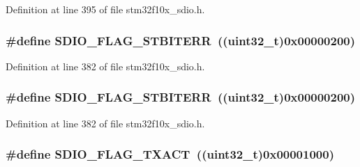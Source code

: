 Definition at line 395 of file stm32f10x\+\_\+sdio.\+h.

\subsubsection[{\texorpdfstring{S\+D\+I\+O\+\_\+\+F\+L\+A\+G\+\_\+\+S\+T\+B\+I\+T\+E\+RR}{SDIO_FLAG_STBITERR}}]{\setlength{\rightskip}{0pt plus 5cm}\#define S\+D\+I\+O\+\_\+\+F\+L\+A\+G\+\_\+\+S\+T\+B\+I\+T\+E\+RR~(({\bf uint32\+\_\+t})0x00000200)}\hypertarget{group___s_d_i_o___flags_gae83f7cb3fa1183898131f3de47c2333e}{}\label{group___s_d_i_o___flags_gae83f7cb3fa1183898131f3de47c2333e}


Definition at line 382 of file stm32f10x\+\_\+sdio.\+h.

\subsubsection[{\texorpdfstring{S\+D\+I\+O\+\_\+\+F\+L\+A\+G\+\_\+\+S\+T\+B\+I\+T\+E\+RR}{SDIO_FLAG_STBITERR}}]{\setlength{\rightskip}{0pt plus 5cm}\#define S\+D\+I\+O\+\_\+\+F\+L\+A\+G\+\_\+\+S\+T\+B\+I\+T\+E\+RR~(({\bf uint32\+\_\+t})0x00000200)}\hypertarget{group___s_d_i_o___flags_gae83f7cb3fa1183898131f3de47c2333e}{}\label{group___s_d_i_o___flags_gae83f7cb3fa1183898131f3de47c2333e}


Definition at line 382 of file stm32f10x\+\_\+sdio.\+h.

\subsubsection[{\texorpdfstring{S\+D\+I\+O\+\_\+\+F\+L\+A\+G\+\_\+\+T\+X\+A\+CT}{SDIO_FLAG_TXACT}}]{\setlength{\rightskip}{0pt plus 5cm}\#define S\+D\+I\+O\+\_\+\+F\+L\+A\+G\+\_\+\+T\+X\+A\+CT~(({\bf uint32\+\_\+t})0x00001000)}\hypertarget{group___s_d_i_o___flags_gad5d075c98012586b169ec131aab2eeb5}{}\label{group___s_d_i_o___flags_gad5d075c98012586b169ec131aab2eeb5}


